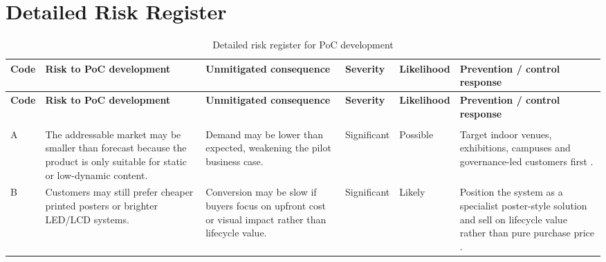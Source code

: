 \documentclass[11pt,a4paper]{article}
\begin{document}
\clearpage

\appendix
\section{Detailed Risk Register}\label{app:detailed-risk-register}

\scriptsize
\begin{longtable}{L{0.8cm}L{3.5cm}L{3.2cm}L{1.3cm}L{1.4cm}L{3.8cm}}
\caption{Detailed risk register for PoC development}\label{tab:detailed-risk-register}\\
\toprule
\textbf{Code} & \textbf{Risk to PoC development} & \textbf{Unmitigated consequence} & \textbf{Severity} & \textbf{Likelihood} & \textbf{Prevention / control response} \\
\midrule
\endfirsthead
\toprule
\textbf{Code} & \textbf{Risk to PoC development} & \textbf{Unmitigated consequence} & \textbf{Severity} & \textbf{Likelihood} & \textbf{Prevention / control response} \\
\midrule
\endhead
\bottomrule
\endfoot

 \\
A & The addressable market may be smaller than forecast because the product is only suitable for static or low-dynamic content. & Demand may be lower than expected, weakening the pilot business case. & Significant & Possible & Target indoor venues, exhibitions, campuses and governance-led customers first \cite{ref6}. \\
B & Customers may still prefer cheaper printed posters or brighter LED/LCD systems. & Conversion may be slow if buyers focus on upfront cost or visual impact rather than lifecycle value. & Significant & Likely & Position the system as a specialist poster-style solution and sell on lifecycle value rather than pure purchase price \cite{ref6,ref4}. \\


\end{longtable}
\end{document}
